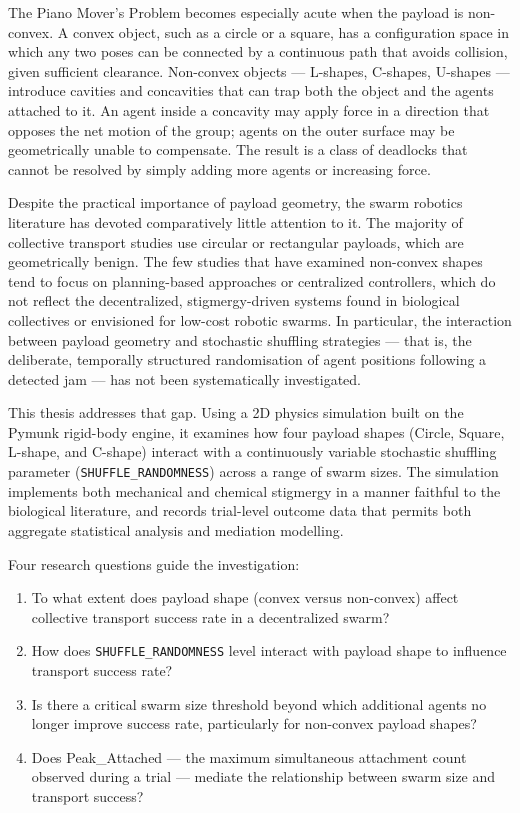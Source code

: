 The Piano Mover's Problem becomes especially acute when the payload is non-convex. A convex object, such as a circle or a square, has a configuration space in which any two poses can be connected by a continuous path that avoids collision, given sufficient clearance. Non-convex objects — L-shapes, C-shapes, U-shapes — introduce cavities and concavities that can trap both the object and the agents attached to it. An agent inside a concavity may apply force in a direction that opposes the net motion of the group; agents on the outer surface may be geometrically unable to compensate. The result is a class of deadlocks that cannot be resolved by simply adding more agents or increasing force.

Despite the practical importance of payload geometry, the swarm robotics literature has devoted comparatively little attention to it. The majority of collective transport studies use circular or rectangular payloads, which are geometrically benign. The few studies that have examined non-convex shapes tend to focus on planning-based approaches or centralized controllers, which do not reflect the decentralized, stigmergy-driven systems found in biological collectives or envisioned for low-cost robotic swarms. In particular, the interaction between payload geometry and stochastic shuffling strategies — that is, the deliberate, temporally structured randomisation of agent positions following a detected jam — has not been systematically investigated.

This thesis addresses that gap. Using a 2D physics simulation built on the Pymunk rigid-body engine, it examines how four payload shapes (Circle, Square, L-shape, and C-shape) interact with a continuously variable stochastic shuffling parameter (\texttt{SHUFFLE\_RANDOMNESS}) across a range of swarm sizes. The simulation implements both mechanical and chemical stigmergy in a manner faithful to the biological literature, and records trial-level outcome data that permits both aggregate statistical analysis and mediation modelling.

Four research questions guide the investigation:

\begin{enumerate}
    \item To what extent does payload shape (convex versus non-convex) affect collective transport success rate in a decentralized swarm?
    \item How does \texttt{SHUFFLE\_RANDOMNESS} level interact with payload shape to influence transport success rate?
    \item Is there a critical swarm size threshold beyond which additional agents no longer improve success rate, particularly for non-convex payload shapes?
    \item Does Peak\_Attached — the maximum simultaneous attachment count observed during a trial — mediate the relationship between swarm size and transport success?
\end{enumerate}


